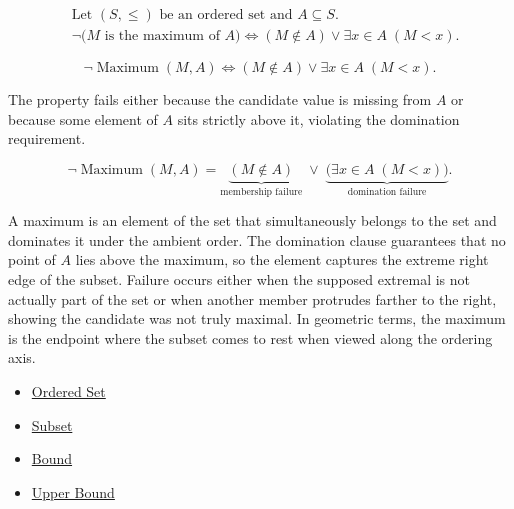 \begin{remark*}
\[
\begin{aligned}
&\text{Let } (S,\le) \text{ be an ordered set and } A \subseteq S.\\
&\neg\bigl(M \text{ is the maximum of } A\bigr)
\Longleftrightarrow
(M \notin A) \lor \exists x \in A\;(M < x).
\end{aligned}
\]
\end{remark*}

\begin{remark*}
\[
\neg \operatorname{Maximum}(M,A) \Longleftrightarrow (M \notin A) \lor \exists x \in A\;(M < x).
\]
\end{remark*}

\begin{remark*}
The property fails either because the candidate value is missing from $A$ or because some element of $A$ sits strictly above it, violating the domination requirement.
\end{remark*}

\begin{remark*}
\[
\neg \operatorname{Maximum}(M,A)
=
\underbrace{(M \notin A)}_{\text{membership failure}}
\;\lor\;
\underbrace{\bigl(\exists x \in A\;(M < x)\bigr)}_{\text{domination failure}}.
\]
\end{remark*}

\begin{remark*}[Interpretation]
A maximum is an element of the set that simultaneously belongs to the set and dominates it under the ambient order. The domination clause guarantees that no point of $A$ lies above the maximum, so the element captures the extreme right edge of the subset. Failure occurs either when the supposed extremal is not actually part of the set or when another member protrudes farther to the right, showing the candidate was not truly maximal. In geometric terms, the maximum is the endpoint where the subset comes to rest when viewed along the ordering axis.
\end{remark*}

\begin{dependencies}
\begin{itemize}
  \item \hyperref[def:ordered-set]{Ordered Set}
  \item \hyperref[def:subset]{Subset}
  \item \hyperref[def:bound]{Bound}
  \item \hyperref[def:upper-bound]{Upper Bound}
\end{itemize}
\end{dependencies}

